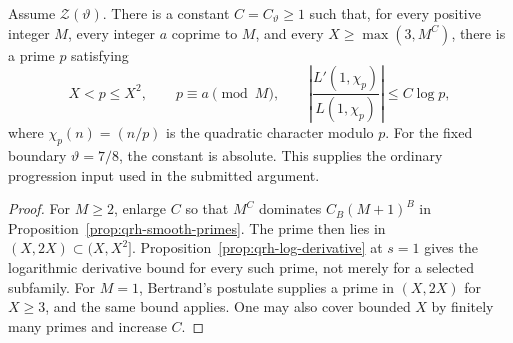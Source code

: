 \begin{corollary}
\label{cor:qrh-ProgAt}
Assume $\mathcal Z(\vartheta)$. There is a constant $C=C_\vartheta\ge1$ such that, for every positive integer $M$,
every integer $a$ coprime to $M$, and every
$X\ge\max(3,M^C)$, there is a prime $p$ satisfying
\[
 X<p\le X^2,\qquad p\equiv a\pmod M,
 \qquad
 \left|\frac{L'(1,\chi_p)}{L(1,\chi_p)}\right|
      \le C\log p,
\]
where $\chi_p(n)=(n/p)$ is the quadratic character modulo
$p$. For the fixed boundary $\vartheta=7/8$, the constant is absolute.
This supplies the ordinary progression input used in the
submitted argument.
\end{corollary}
\begin{proof}
For $M\ge2$, enlarge $C$ so that $M^C$ dominates
$C_B(M+1)^B$ in Proposition~\ref{prop:qrh-smooth-primes}.
The prime then lies in $(X,2X)\subset(X,X^2]$.
Proposition~\ref{prop:qrh-log-derivative} at $s=1$ gives
the logarithmic derivative bound for every such prime,
not merely for a selected subfamily. For $M=1$,
Bertrand's postulate supplies a prime in $(X,2X)$ for
$X\ge3$, and the same bound applies. One may also cover
bounded $X$ by finitely many primes and increase $C$.
\end{proof}

